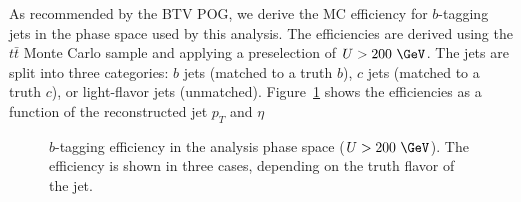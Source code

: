 As recommended by the BTV POG, we derive the MC efficiency for $b$-tagging jets in the phase space used by this analysis.
The efficiencies are derived using the $t\bar{t}$ Monte Carlo sample and applying a preselection of $U>200~\GeV$.
The jets are split into three categories: $b$ jets (matched to a truth $b$), $c$ jets (matched to a truth $c$), or light-flavor jets (unmatched).
Figure~\ref{fig:btageffs} shows the efficiencies as a function of the reconstructed jet $p_{T}$ and $\eta$

\begin{figure}[htbp]
  \centering
  \caption{$b$-tagging efficiency in the analysis phase space ($U>200~\GeV$). The efficiency is shown in three cases, depending on the truth flavor of the jet.}
  \label{fig:btageffs}
\end{figure}


